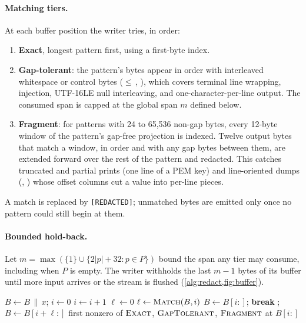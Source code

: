 \documentclass[10pt,twocolumn]{article}
\newcommand{\code}[1]{\textup{\texttt{\detokenize{#1}}}}
\newcommand{\red}{\textup{\texttt{[REDACTED]}}}
\begin{document}
\paragraph{Matching tiers.} At each buffer position the writer tries, in order:
\begin{enumerate}
\item \textbf{Exact}, longest pattern first, using a first-byte index.
\item \textbf{Gap-tolerant}: the pattern's bytes appear in order with
  interleaved whitespace or control bytes ($\leq$\,\code{0x20}, \code{0x7F}),
  which covers terminal line wrapping, \code{\r\n} injection, UTF-16LE
  null interleaving, and one-character-per-line output. The consumed span is
  capped at the global span $m$ defined below.
\item \textbf{Fragment}: for patterns with 24 to 65{,}536 non-gap bytes,
  every 12-byte window of the pattern's gap-free projection is indexed.
  Twelve output bytes that match a window, in order and with any gap bytes
  between them, are extended forward over the rest of the pattern and redacted.
  This catches truncated and partial prints (one line of a PEM key) and
  line-oriented dumps (\code{xxd}, \code{od -c}) whose offset columns cut a
  value into per-line pieces.
\end{enumerate}
A match is replaced by \red{}; unmatched bytes are emitted only once no pattern
could still begin at them.

\paragraph{Bounded hold-back.} Let $m = \max(\{1\} \cup \{2|p|+32 : p\in P\})$ bound the
span any tier may consume, including when $P$ is empty. The writer withholds the last $m-1$ bytes of its
buffer until more input arrives or the stream is flushed
(\cref{alg:redact,fig:buffer}).

\begin{algorithm}[t]
\caption{Streaming redaction (one output stream)}
\label{alg:redact}
\small
\begin{algorithmic}[1]
 \State $B \gets B \,\|\, x$;  \EndProcedure
{} \State {} \EndProcedure
{}
    \State $i \gets 0$
     \State $i \gets i+1$ \EndWhile
    \State $\ell \gets 0$
     \State $\ell \gets \textsc{Match}(B,i)$ \EndIf
    \State {}
     \State $B \gets B[i{:}]$; \textbf{break} \EndIf
    \State \Call{Emit}{\red}; $B \gets B[i+\ell{:}]$
  \EndWhile
\EndProcedure
{} 
  \State \Return first nonzero of $\textsc{Exact}$, $\textsc{GapTolerant}$, $\textsc{Fragment}$ at $B[i{:}]$
\EndFunction
\end{algorithmic}
\end{algorithm}
\end{document}
